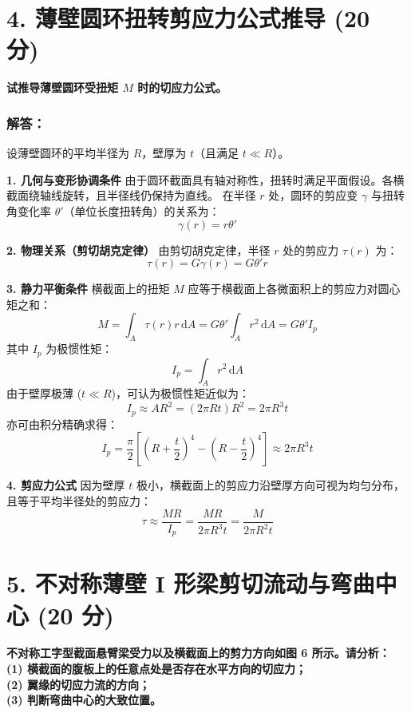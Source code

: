 \documentclass[11pt,a4paper]{ctexrep}
\newcommand{\diff}{\,\mathrm{d}}
\begin{document}
{%


\section*{4. 薄壁圆环扭转剪应力公式推导 (20 分)}

\textbf{试推导薄壁圆环受扭矩 $M$ 时的切应力公式。}

\subsubsection*{解答：}

设薄壁圆环的平均半径为 $R$，壁厚为 $t$（且满足 $t \ll R$）。

\textbf{1. 几何与变形协调条件}
由于圆环截面具有轴对称性，扭转时满足平面假设。各横截面绕轴线旋转，且半径线仍保持为直线。
在半径 $r$ 处，圆环的剪应变 $\gamma$ 与扭转角变化率 $\theta'$（单位长度扭转角）的关系为：
\[
\gamma(r) = r \theta'
\]

\textbf{2. 物理关系（剪切胡克定律）}
由剪切胡克定律，半径 $r$ 处的剪应力 $\tau(r)$ 为：
\[
\tau(r) = G \gamma(r) = G \theta' r
\]

\textbf{3. 静力平衡条件}
横截面上的扭矩 $M$ 应等于横截面上各微面积上的剪应力对圆心矩之和：
\[
M = \int_A \tau(r) r \diff A = G \theta' \int_A r^2 \diff A = G \theta' I_p
\]
其中 $I_p$ 为极惯性矩：
\[
I_p = \int_A r^2 \diff A
\]
由于壁厚极薄 ($t \ll R$)，可认为极惯性矩近似为：
\[
I_p \approx A R^2 = (2\pi R t) R^2 = 2\pi R^3 t
\]
亦可由积分精确求得：
\[
I_p = \frac{\pi}{2} \left[ \left(R+\frac{t}{2}\right)^4 - \left(R-\frac{t}{2}\right)^4 \right] \approx 2\pi R^3 t
\]

\textbf{4. 剪应力公式}
因为壁厚 $t$ 极小，横截面上的剪应力沿壁厚方向可视为均匀分布，且等于平均半径处的剪应力：
\[
\tau \approx \frac{M R}{I_p} = \frac{M R}{2\pi R^3 t} = \frac{M}{2\pi R^2 t}
\]




\section*{5. 不对称薄壁 I 形梁剪切流动与弯曲中心 (20 分)}

\textbf{不对称工字型截面悬臂梁受力以及横截面上的剪力方向如图 6 所示。请分析：\\
(1) 横截面的腹板上的任意点处是否存在水平方向的切应力；\\
(2) 翼缘的切应力流的方向；\\
(3) 判断弯曲中心的大致位置。}

}
\end{document}
